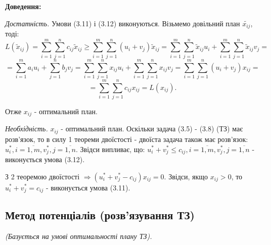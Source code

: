 \documentclass[12pt,a4paper]{book}
\begin{document}
{\bf Доведення:}

{\it Достатність.} Умови (3.11) і (3.12) виконуються. Візьмемо довільний план $\tilde{x_{ij}}$, тоді:\\
$$ L(\tilde{x}_{ij}) = \sum_{i=1}^m \sum_{j=1}^n c_{ij} \tilde{x}_{ij} \geq
 \sum_{i=1}^m \sum_{j=1}^n (u_i+v_j) \tilde{x}_{ij} = 
 \sum_{i=1}^m \sum_{j=1}^n \tilde{x}_{ij} u_i + \sum_{i=1}^m \sum_{j=1}^n  \tilde{x}_{ij} v_j = $$
$$ = \sum_{i=1}^m a_i u_i + \sum_{j=1}^n b_j v_j =
 \sum_{i=1}^m \sum_{j=1}^n x_{ij} u_i + \sum_{i=1}^m \sum_{j=1}^n  x_{ij} v_j =
 \sum_{i=1}^m \sum_{j=1}^n (u_i+v_j) x_{ij} = $$
$$ = \sum_{i=1}^m \sum_{j=1}^n c_{ij} x_{ij} = L(x_{ij}). $$

Отже $x_{ij}$ - оптимальний план.

{\it Необхідність.} $x_{ij}$ - оптимальний план. Оскільки задача (3.5) - (3.8) (ТЗ) має розв’язок, то в силу 1 теореми двоїстості - двоїста задача також має розв’язок: $u^*_i, i = \overline{1,m}, v^*_j, j= \overline{1,n}$. Звідси випливає, що: $u^*_i+v^*_j \leq c_{ij}, i = \overline{1,m}, v^*_j, j= \overline{1,n}$ - виконується умова (3.12).

З 2 теоремою двоїстості $\Rightarrow (u^*_i + v^*_j - c_{ij})x_{ij}=0$. Звідси, якщо $x_{ij}>0$, то $u^*_i + v^*_j = c_{ij}$ - виконується умова (3.11).

\subsection{Метод потенціалів (розв’язування ТЗ)}

\emph{(Базується на умові оптимальності плану ТЗ).}
\end{document}

